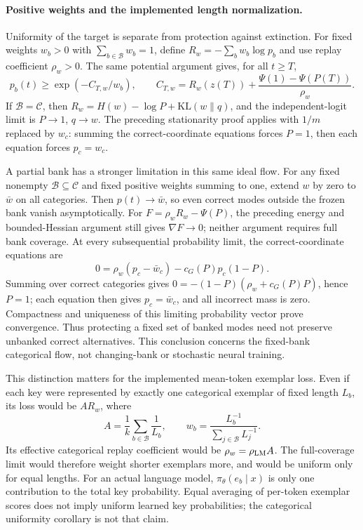 \paragraph{Positive weights and the implemented length normalization.}
Uniformity of the target is separate from protection against extinction.
For fixed weights $w_b>0$ with $\sum_{b\in\mathcal B}w_b=1$, define
$R_w=-\sum_b w_b\log p_b$ and use replay coefficient $\rho_w>0$.
The same potential argument gives, for all $t\ge T$,
\[
 p_b(t)\ge\exp(-C_{T,w}/w_b),\qquad
 C_{T,w}=R_w(z(T))+\frac{\Psi(1)-\Psi(P(T))}{\rho_w}.
\]
If $\mathcal B=\mathcal C$, then
$R_w=H(w)-\log P+\mathrm{KL}(w\|q)$, and the independent-logit limit is
$P\to1$, $q\to w$. The preceding stationarity proof applies with $1/m$
replaced by $w_c$: summing the correct-coordinate equations forces $P=1$,
then each equation forces $p_c=w_c$.

A partial bank has a stronger limitation in this same ideal flow. For any
fixed nonempty $\mathcal B\subseteq\mathcal C$ and fixed positive weights
summing to one, extend $w$ by zero to $\bar w$ on all categories. Then
$p(t)\to\bar w$, so even correct modes outside the frozen bank vanish
asymptotically. For $F=\rho_wR_w-\Psi(P)$, the preceding energy and
bounded-Hessian argument still gives $\nabla F\to0$; neither argument
requires full bank coverage.
At every subsequential probability limit, the correct-coordinate equations are
\[
 0=\rho_w(p_c-\bar w_c)-c_G(P)p_c(1-P).
\]
Summing over correct categories gives
$0=-(1-P)(\rho_w+c_G(P)P)$, hence $P=1$; each equation then gives
$p_c=\bar w_c$, and all incorrect mass is zero. Compactness and uniqueness
of this limiting probability vector prove convergence. Thus protecting a
fixed set of banked modes need not preserve unbanked correct alternatives.
This conclusion concerns the fixed-bank categorical flow, not changing-bank
or stochastic neural training.

This distinction matters for the implemented mean-token exemplar loss.
Even if each key were represented by exactly one categorical exemplar of
fixed length $L_b$, its loss would be $A R_w$, where
\[
 A=\frac1k\sum_{b\in\mathcal B}\frac1{L_b},\qquad
 w_b=\frac{L_b^{-1}}{\sum_{j\in\mathcal B}L_j^{-1}}.
\]
Its effective categorical replay coefficient would be $\rho_w=\rho_{\rm LM}A$.
The full-coverage limit would therefore weight shorter exemplars more, and
would be uniform only for equal lengths. For an actual language model,
$\pi_\theta(e_b\mid x)$ is only one contribution to the total key probability.
Equal averaging of per-token exemplar scores does not imply uniform learned
key probabilities; the categorical uniformity corollary is not that claim.

